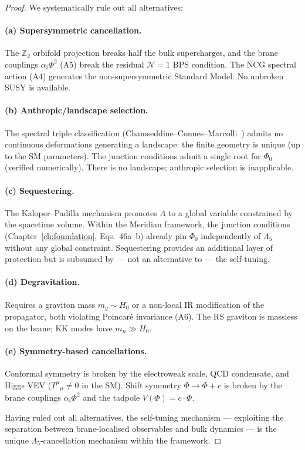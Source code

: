 \begin{proof}
We systematically rule out all alternatives:

\paragraph{(a) Supersymmetric cancellation.} The $\mathbb{Z}_2$ orbifold projection breaks half the bulk supercharges, and the brane couplings $\alpha_i\Phi^2$ (A5) break the residual $\mathcal{N}=1$ BPS condition. The NCG spectral action (A4) generates the non-supersymmetric Standard Model. No unbroken SUSY is available.

\paragraph{(b) Anthropic/landscape selection.} The spectral triple classification (Chamseddine--Connes--Marcolli~\cite{ch3:chamseddine1997,ch3:connes1994}) admits no continuous deformations generating a landscape: the finite geometry is unique (up to the SM parameters). The junction conditions admit a single root for $\Phi_0$ (verified numerically). There is no landscape; anthropic selection is inapplicable.

\paragraph{(c) Sequestering.} The Kaloper--Padilla mechanism promotes $\Lambda$ to a global variable constrained by the spacetime volume. Within the Meridian framework, the junction conditions (Chapter~\ref{ch:foundation}, Eqs.~46a--b) already pin $\Phi_0$ independently of $\Lambda_5$ without any global constraint. Sequestering provides an additional layer of protection but is subsumed by --- not an alternative to --- the self-tuning.

\paragraph{(d) Degravitation.} Requires a graviton mass $m_g \sim H_0$ or a non-local IR modification of the propagator, both violating Poincar\'e invariance (A6). The RS graviton is massless on the brane; KK modes have $m_n \gg H_0$.

\paragraph{(e) Symmetry-based cancellations.} Conformal symmetry is broken by the electroweak scale, QCD condensate, and Higgs VEV ($T^\mu{}_\mu \neq 0$ in the SM). Shift symmetry $\Phi \to \Phi + c$ is broken by the brane couplings $\alpha_i\Phi^2$ and the tadpole $V(\Phi) = c\cdot\Phi$.

Having ruled out all alternatives, the self-tuning mechanism --- exploiting the separation between brane-localised observables and bulk dynamics --- is the unique $\Lambda_5$-cancellation mechanism within the framework.
\end{proof}

